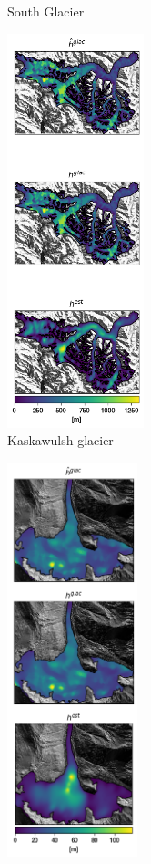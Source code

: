 \documentclass[a4, 12pt]{article}
\begin{document}
\begin{landscape}
\begin{figure}[h!]
{\begin{subfigure}{0.225\linewidth}
\caption{South Glacier}
\label{fig:glate_sg_thickness}
\end{subfigure}
\hfill
\begin{subfigure}{0.225\linewidth}
\centering
\includegraphics[height=4.5in]{../imgs/Kaskawulsh glacier/glate_thickness_all_models.png}
\caption{Kaskawulsh glacier}
\label{fig:glate_kaska_thickness}
\end{subfigure}
\hfill
\begin{subfigure}{0.225\linewidth}
\centering
\includegraphics[height=4.5in]{../imgs/Job glacier/glate_thickness_all_models.png}

\end{subfigure}}
\end{figure}
\end{landscape}
\end{document}
